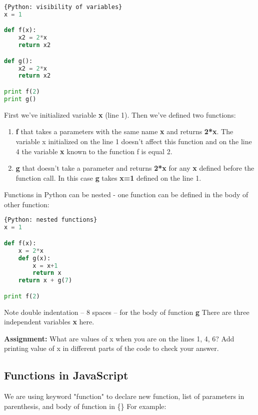 \begin{lstlisting}[style=codelst,language=Python]{Python: visibility of variables}
x = 1

def f(x):
    x2 = 2*x
    return x2

def g():
    x2 = 2*x
    return x2

print f(2)
print g()
\end{lstlisting}
First we've initialized variable \textbf{x} (line 1). Then we've
defined two functions:

\begin{enumerate}
\item \textbf{f} that takes a parameters with the same
name \textbf{x} and returns \textbf{2*x}. The variable x initialized on
the line 1 doesn't affect this function and
on the line 4 the variable \textbf{x} known to
the function f is equal 2.
\item \textbf{g} that doesn't take a parameter and returns \textbf{2*x} for
any \textbf{x} defined before the function call. In this case \textbf{g}
takes \textbf{x=1} defined on the line 1.
\end{enumerate}

Functions in Python can be nested - one function can be defined in
the body of other function:

\begin{lstlisting}[style=codelst,language=Python]{Python: nested functions}
x = 1

def f(x):
    x = 2*x
    def g(x):
        x = x+1
        return x
    return x + g(7)

print f(2)
\end{lstlisting}
Note double indentation -- 8 spaces -- for the body of function \textbf{g}
There are three independent variables \textbf{x} here.

\bigskip
\begin{tcolorbox}
\textbf{Assignment:}
What are values of x when you are on the lines 1, 4, 6?
Add printing value of x in different parts of the code
to check your answer.
\end{tcolorbox}

\subsection{Functions in JavaScript}

We are using keyword "function" to declare new function, list of parameters in
parenthesis, and body of function in \{\}
For example:

